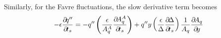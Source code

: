 {%
Similarly, for the Favre fluctuations, the slow derivative term becomes
%
\begin{align}
- \epsilon \pp{\ffluc{q}}{t_s}
     = - \ffluc{q}
           \left(\frac{\epsilon}{A_q^A} \pp{A_q^A}{t_s} \right)
      +\ffluc{q}  y \left(\frac{\epsilon}{\Delta} \pp{\Delta}{t_s}\right)
              \frac{1}{A_{q}} \pp{A_{q}}{y}
\end{align}
%
%
%

}
